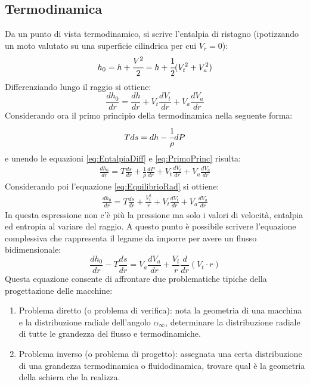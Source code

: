 \subsection{Termodinamica}
Da un punto di vista termodinamico, si scrive l'entalpia di ristagno (ipotizzando un moto valutato su una superficie cilindrica per cui $V_r = 0$):
\begin{align*}
h_0 = h + \cfrac{V^2}{2} = h + \cfrac{1}{2}(V_t^2 + V_a^2)
\end{align*}
Differenziando lungo il raggio si ottiene:
\begin{equation}
\frac{dh_0}{dr} = \frac{dh}{dr} + V_t \frac{dV_t}{dr} + V_a \frac{dV_a}{dr}
\label{eq:EntalpiaDiff}
\end{equation}
Considerando ora il primo principio della termodinamica nella seguente forma:
\begin{equation}
Tds = dh - \cfrac{1}{\rho} dP
\label{eq:PrimoPrinc}
\end{equation}
e unendo le equazioni \ref{eq:EntalpiaDiff} e \ref{eq:PrimoPrinc} risulta:
\begin{align*}
\frac{dh_0}{dr} = T \frac{ds}{dr} + \frac{1}{\rho} \frac{dP}{dr} + V_t \frac{dV_t}{dr} + V_a \frac{dV_a}{dr}
\end{align*}
Considerando poi l'equazione \ref{eq:EquilibrioRad} si ottiene:
\begin{align*}
\frac{dh_0}{dr} = T \frac{ds}{dr} + \frac{V_t^2}{r} + V_t \frac{dV_t}{dr} + V_a \frac{dV_a}{dr}
\end{align*}
In questa espressione non c'è più la pressione ma solo i valori di velocità, entalpia ed entropia al variare del raggio. A questo punto è possibile scrivere l'equazione complessiva che rappresenta il legame da imporre per avere un flusso bidimensionale:
\begin{equation}
\boxed{ \frac{dh_0}{dr} - T\frac{ds}{dr} = V_a \frac{dV_a}{dr} + \frac{V_t}{r} \frac{d}{dr}(V_t \cdot r)}
\end{equation}
Questa equazione consente di affrontare due problematiche tipiche della progettazione delle macchine:
\begin{enumerate}
\item Problema diretto (o problema di verifica): nota la geometria di una macchina e la distribuzione radiale dell'angolo $\alpha_{\infty}$, determinare la distribuzione radiale di tutte le grandezza del flusso e termodinamiche.
\item Problema inverso (o problema di progetto): assegnata una certa distribuzione di una grandezza termodinamica o fluidodinamica, trovare qual è la geometria della schiera che la realizza.
\end{enumerate}
